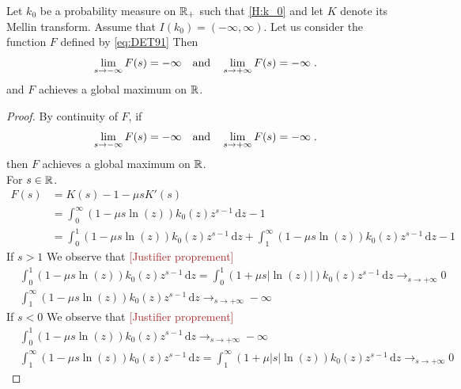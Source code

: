 \documentclass[11pt]{amsart}
\newcommand{\diff}{\,\mathrm{d}}
\newcommand{\ndr}[1]{\textcolor{brown}{[#1]}}
\begin{document}
    \begin{lemma}
    \label{lm:coerciveF}
    Let $k_0$ be a probability measure on $\mathbb{R}_+$ such that \eqref{H:k_0} and let $K$ denote its Mellin transform. Assume that $I(k_0) = (-\infty, \infty)$. Let us consider the function $F$ defined by \eqref{eq:DET91}
        Then 
        \begin{equation*}
            \lim_{s \to -\infty} F(s) = -\infty 
            \quad \text{and} \quad
            \lim_{s \to +\infty} F(s) = -\infty 
            \; .
        \end{equation*}
    and $F$ achieves a global maximum on $\mathbb{R}$. 
    \end{lemma}
    \begin{proof}
        By continuity of $F$, if  \begin{equation*}
            \lim_{s \to -\infty} F(s) = -\infty 
            \quad \text{and} \quad
            \lim_{s \to +\infty} F(s) = -\infty 
            \; .
        \end{equation*}
        then $F$ achieves a global maximum on $\mathbb{R}$.\\
        For $s \in \mathbb{R}$.  
        \begin{align*}
            F(s) 
            &= K(s) - 1 - \mu s K'(s) \\
            &= \int_0^\infty (1 - \mu s \ln(z))k_0(z)z^{s-1} \diff z - 1 \\
            &= \int_0^1 (1 - \mu s \ln(z))k_0(z)z^{s-1} \diff z +  \int_1^\infty (1 - \mu s \ln(z))k_0(z)z^{s-1} \diff z
             - 1 
        \end{align*}
    If $s > 1$
    We observe that \ndr{Justifier proprement}
    \begin{align*}
        &\int_0^1 (1 - \mu s \ln(z))k_0(z)z^{s-1} \diff z
        = \int_0^1 (1 + \mu s |\ln(z)|)k_0(z)z^{s-1} \diff z
        \to_{s \to +\infty} 0 \\
        &\int_1^\infty (1 - \mu s \ln(z))k_0(z)z^{s-1} \diff z
        \to_{s \to +\infty} -\infty
    \end{align*}
    If $s < 0$
    We observe that \ndr{Justifier proprement}
    \begin{align*}
        &\int_0^1 (1 - \mu s \ln(z))k_0(z)z^{s-1} \diff z
        \to_{s \to +\infty} -\infty \\
        &\int_1^\infty (1 - \mu s \ln(z))k_0(z)z^{s-1} \diff z = \int_1^\infty (1 + \mu |s| \ln(z))k_0(z)z^{s-1} \diff z
        \to_{s \to +\infty} 0
    \end{align*}
    \end{proof}
\end{document}
